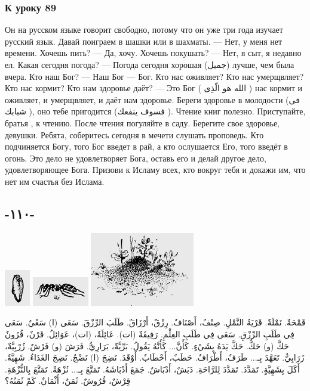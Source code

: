 \documentclass[a5paper]{article}
\begin{document}
\subsubsection[К уроку 89]{К уроку 89}
Он на русском языке говорит свободно, потому что он уже три года изучает русский язык. Давай поиграем в шашки или в шахматы. — Нет, у меня нет времени. Хочешь пить? — Да, хочу. Хочешь поку­шать? — Нет, я сыт, я недавно ел. Какая сегодня погода? — Погода сегодня хорошая (جميل) лучше, чем была вчера. Кто наш Бог? — Наш Бог — Бог. Кто нас оживляет? Кто нас умерщвляет? Кто нас кормит? Кто нам здоровье даёт? — Это Бог ( الله هو الّذِى ) нас кормит и оживляет, и умерщвляет, и даёт нам здоровье. Береги здоровье в молодости (فى شبابك ), оно тебе пригодится (فسوف ينفعك ). Чтение книг полезно. Приступайте, братья , к чтению. После чтения погуляйте в саду. Берегите свое здоровье, девушки. Ребята, соберитесь сегодня в мечети слушать проповедь. Кто подчиняется Богу, того Бог введет в рай, а кто ослушается Его, того введёт в огонь. Это дело не удовлетворяет Бога, оставь его и делай другое дело, удовлетворяющее Бога. Призови к Исламу всех, кто вокруг тебя и докажи им, что нет им счастья без Ислама.

\subsection{-١١٠-}
 \includegraphics[width=0.4374in,height=0.6252in]{images/MuhammadBagauddinprettified-img283.png}   \includegraphics[width=0.9689in,height=0.5in]{images/MuhammadBagauddinprettified-img284.png}   \includegraphics[width=1.7917in,height=1.2709in]{images/MuhammadBagauddinprettified-img285.png} 

قَمْحَةٌ. نَمْلَةٌ. قَرْيَةُ النَّمْلِ. صِنْفٌ، أَصْنَافٌ. \newline
رِزْقٌ، أَرْزَاقٌ. طَلَبَ الرِّزْقَ. سَعَى (ا) سَعْيٌ. سَعَى فِي طَلَبِ الرِّزْقِ. سَعَى فِي طَلَبِ العِلْمِ. رَفِيقَةٌ (ات). عَائِلَةٌ، (ات)، عَوَائِلُ. قَرْنٌ، قُرُونٌ \newline
حَكَّ (و) حَكٌّ. حَكَّ يَدَهُ بِشَيْءٍ. كَأَنَّ... كَأَنَّهُ يَقُولُ. بَرِّيَّةٌ، بَرَارِيُّ. فَرَشَ (و) فَرْشٌ. زُرْبِيَّةٌ، زَرَابِيُّ. تَعَهَّدَ بِـ... طَرَفٌ، أَطْرَافٌ. حَطَبٌ، أَحْطَابٌ. أَوْقَدَ. نَضِجَ (ا) نَضْجٌ. نَضِجَ الغَدَاءُ. شَهِيَّةٌ. أَكَلَ بِشَهِيَّةٍ. تَمَدَّدَ. تَمَدَّدَ لِلرَّاحَةِ. دَبَشٌ، أَدْبَاشٌ. جَمَعَ أَدْبَاشَهُ. تَمَتَّعَ بِـ... نُزْهَةٌ. تَمَتَّعَ بِالنُّزْهَةِ. قِرْشٌ، قُرُوشٌ. ثَمَنٌ، أَثْمَانٌ. كَمْ ثَمَنُهُ؟
\end{document}
